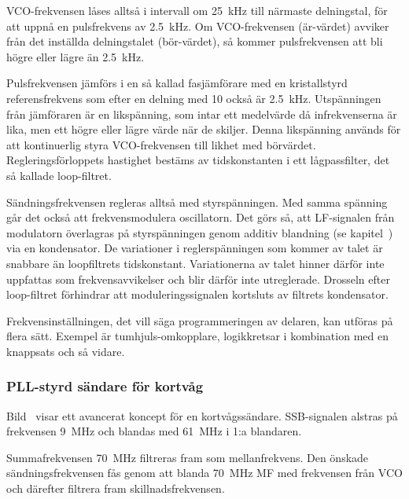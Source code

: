 VCO-frekvensen låses alltså i intervall om \qty{25}{\kilo\hertz} till närmaste
delningstal, för att uppnå en pulsfrekvens av \qty{2,5}{\kilo\hertz}.
Om VCO-frekvensen (är-värdet) avviker från det inställda delningstalet
(bör-värdet), så kommer pulsfrekvensen att bli högre eller lägre än
\qty{2,5}{\kilo\hertz}.

Pulsfrekvensen jämförs i en så kallad fasjämförare med en kristallstyrd
referensfrekvens som efter en delning med 10 också är \qty{2,5}{\kilo\hertz}.
Utspänningen från jämföraren är en likspänning, som intar ett
medelvärde då infrekvenserna är lika, men ett högre eller lägre värde
när de skiljer.
Denna likspänning används för att kontinuerlig styra VCO-frekvensen
till likhet med börvärdet.
Regleringsförloppets hastighet bestäms av tidskonstanten i ett
lågpassfilter, det så kallade loop-filtret.

Sändningsfrekvensen regleras alltså med styrspänningen.
Med samma spänning går det också att frekvensmodulera oscillatorn.
Det görs så, att LF-signalen från modulatorn överlagras på styrspänningen genom
additiv blandning (se kapitel~) via en kondensator.
De variationer i reglerspänningen som kommer av talet är snabbare än
loopfiltrets tidskonstant.
Variationerna av talet hinner därför inte uppfattas som frekvensavvikelser och
blir därför inte utreglerade.
Drosseln efter loop-filtret förhindrar att moduleringssignalen
kortsluts av filtrets kondensator.

Frekvensinställningen, det vill säga programmeringen av delaren, kan utföras
på flera sätt. Exempel är tumhjuls-omkopplare,
logikkretsar i kombination med en knappsats och så vida\-re.

\subsubsection{PLL-styrd sändare för kortvåg}


Bild~ visar ett avancerat koncept för en kortvågssändare.
SSB-signalen alstras på frekvensen \qty{9}{\mega\hertz} och blandas med
\qty{61}{\mega\hertz} i 1:a blandaren.

Summafrekvensen \qty{70}{\mega\hertz} filtreras fram som mellanfrekvens.
Den önskade sändningsfrekvensen fås genom att blanda \qty{70}{\mega\hertz} MF
med frekvensen från VCO och därefter filtrera fram skillnadsfrekvensen.

